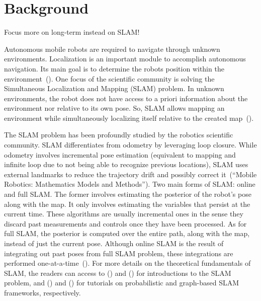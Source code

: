 \documentclass[10pt,a4paper,notitlepage,twocolumn,oneside]{article}
\begin{document}
\section{Background}
\label{sec:background}

Focus more on long-term instead on SLAM!

Autonomous mobile robots are required to navigate through unknown environments. Localization is an important module to accomplish autonomous navigation. Its main goal is to determine the robots position within the environment~(\cite{book:intro-robotics}). One focus of the scientific community is solving the Simultaneous Localization and Mapping (SLAM) problem. In unknown environments, the robot does not have access to a priori information about the environment nor relative to its own pose. So, SLAM allows mapping an environment while simultaneously localizing itself relative to the created map~(\cite{book:probabilistic-robotics}).

The SLAM problem has been profoundly studied by the robotics scientific community. SLAM differentiates from odometry by leveraging loop closure. While odometry involves incremental pose estimation (equivalent to mapping and infinite loop due to not being able to recognize previous locations), SLAM uses external landmarks to reduce the trajectory drift and possibly correct it~(``Mobile Robotics: Mathematics Models and Methods''). Two main forms of SLAM: online and full SLAM. The former involves estimating the posterior of the robot's pose along with the map. It only involves estimating the variables that persist at the current time. These algorithms are usually incremental ones in the sense they discard past measurements and controls once they have been processed. As for full SLAM, the posterior is computed over the entire path, along with the map, instead of just the current pose. Although online SLAM is the result of integrating out past poses from full SLAM problem, these integrations are performed one-at-a-time~(\cite{book:probabilistic-robotics}). For more details on the theoretical fundamentals of SLAM, the readers can access to (\cite{book:probabilistic-robotics}) and (\cite{book:handbook-robotics}) for introductions to the SLAM problem, and (\cite{background:slam:durrant-whyte-bailey,background:slam:bailey-durrant-whyte}) and (\cite{background:slam:grisetti}) for tutorials on probabilistic and graph-based SLAM frameworks, respectively.
\end{document}
